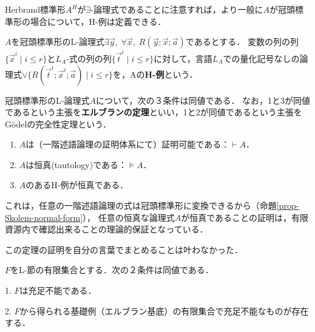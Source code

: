 \documentclass[uplatex, dvipdfmx]{jsreport}
\begin{document}
Herbrand標準形$A^H$が$\exists$-論理式であることに注意すれば，より一般に$A$が冠頭標準形の場合について，H-例は定義できる．

\begin{definition}
    $A$を冠頭標準形のL-論理式$\exists\vec{y},\;\forall\vec{x},\;R(\vec{y};\vec{x};\vec{a})$であるとする．
    変数の列の列$\{\vec{x}^i\mid i\le r\}$と$L_A$-式の列の列$\{\vec{t}^i\mid i\le r\}$に対して，言語$L_A$での量化記号なしの論理式$\lor\{R(\vec{t}^i;\vec{x}^i;\vec{a})\mid i\le r\}$を，Aの\textbf{H-例}という．
\end{definition}

\begin{theorem}\label{thm-Herbrand}
    冠頭標準形のL-論理式$A$について，次の３条件は同値である．
    なお，1と3が同値であるという主張を\textbf{エルブランの定理}といい，1と2が同値であるという主張をGödelの完全性定理という．
    \begin{enumerate}
        \item $A$は（一階述語論理の証明体系にて）証明可能である：$\vdash A$．
        \item $A$は恒真(tautology)である：$\vDash A$．
        \item $A$のあるH-例が恒真である．
    \end{enumerate}
\end{theorem}
\begin{remark}
    これは，任意の一階述語論理の式は冠頭標準形に変換できるから（命題\ref{prop-Skolem-normal-form}），
    任意の恒真な論理式$A$が恒真であることの証明は，有限資源内で確認出来ることの理論的保証となっている．
\end{remark}
この定理の証明を自分の言葉でまとめることは叶わなかった．

\begin{theorem}
    $F$をL-節の有限集合とする．次の２条件は同値である．

    1. $F$は充足不能である．

    2. $F$から得られる基礎例（エルブラン基底）の有限集合で充足不能なものが存在する．
\end{theorem}
\end{document}
